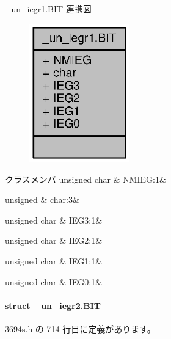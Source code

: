 \+\_\+un\+\_\+iegr1.\+B\+I\+T 連携図
\nopagebreak
\begin{figure}[H]
\begin{center}
\leavevmode
\includegraphics[width=123pt]{d5/d4b/struct__un__iegr1_8BIT__coll__graph}
\end{center}
\end{figure}
\begin{DoxyFields}{クラスメンバ}
unsigned char\label{3694s_8h_a5dc99c7ae8ffa6409c251799cd9eb3fc}
&
N\+M\+I\+E\+G\+:1&
\\
\hline

unsigned\label{3694s_8h_aa87deb01c5f539e6bda34829c8ef2368}
&
char\+:3&
\\
\hline

unsigned char\label{3694s_8h_a592c7c4f4bbded03d5a7c3df061e427d}
&
I\+E\+G3\+:1&
\\
\hline

unsigned char\label{3694s_8h_a37fcab6a22f6743ce75d57007a6fc35e}
&
I\+E\+G2\+:1&
\\
\hline

unsigned char\label{3694s_8h_aaf314b73213d1540a64c6ddee2ab605d}
&
I\+E\+G1\+:1&
\\
\hline

unsigned char\label{3694s_8h_acc18c2662377ff34fc672a76fdb71d0f}
&
I\+E\+G0\+:1&
\\
\hline

\end{DoxyFields}
\label{struct__un__iegr2_8BIT}
\paragraph{struct \+\_\+un\+\_\+iegr2.\+B\+I\+T}


 3694s.\+h の 714 行目に定義があります。



